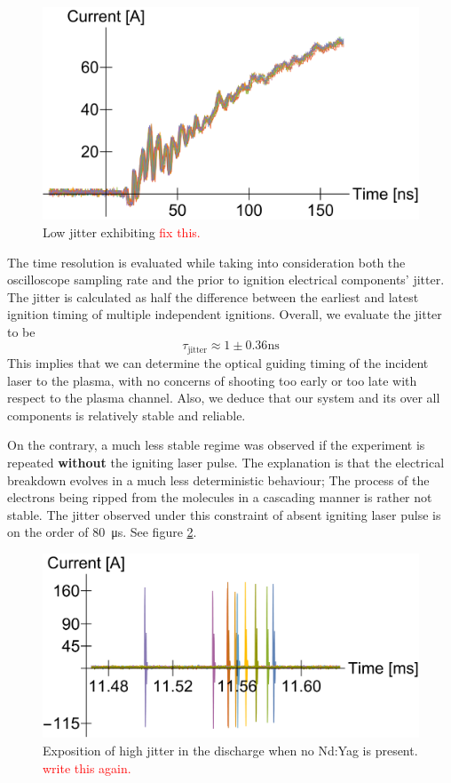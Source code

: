 \documentclass[justified,nofonts,nobib,openany]{tufte-book}
\begin{document}
\begin{figure}
    \centering
    \includegraphics[width=\textwidth]{figures/jitter/low_jitter.pdf}
    \caption{Low jitter exhibiting \textcolor{red}{fix this.}}
    \label{fig:low_jitter}
\end{figure}

The time resolution is evaluated while taking into consideration both the oscilloscope sampling rate and the prior to ignition electrical components' jitter. The jitter is calculated as half the difference between the earliest and latest ignition timing of multiple independent ignitions. Overall, we evaluate the jitter to be
\begin{equation}
	\tau_\text{jitter}\approx 1\pm 0.36\si{\ns}
\end{equation}
This implies that we can determine the optical guiding timing of the incident laser to the plasma, with no concerns of shooting too early or too late with respect to the plasma channel. Also, we deduce that our system and its over all components is relatively stable and reliable.

On the contrary, a much less stable regime was observed if the experiment is repeated \textbf{without} the igniting laser pulse. The explanation is that the electrical breakdown evolves in a much less deterministic behaviour; The process of the electrons being ripped from the molecules in a cascading manner is rather not stable. The jitter observed under this constraint of absent igniting laser pulse is on the order of \SI{80}{\us}. See figure \ref{fig:multiple}.
\begin{figure}
    \centering
    \includegraphics[width=\textwidth]{figures/jitter/multiple.pdf}
    \caption{Exposition of high jitter in the discharge when no Nd:Yag is present. \textcolor{red}{write this again.}}
    \label{fig:multiple}
\end{figure}
\end{document}
